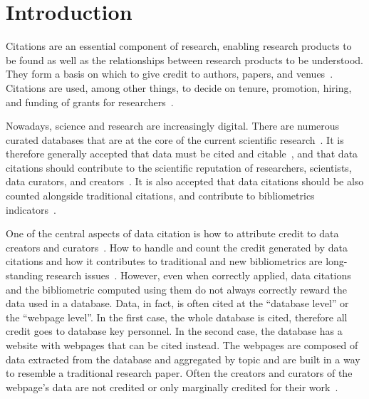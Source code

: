 \section{Introduction}

Citations are an essential component of research, enabling research products to be found as well as the relationships between research products to be understood. 
They form a basis on which to give credit to authors, papers, and venues~\citep{ZouP16, cousijn2019bringing, cronin1984}.
Citations are used, among other things, to decide on tenure, promotion, hiring, and funding of grants for researchers~\citep{meho2007impact, Cronin01, Hartley17, Kosten16}.

Nowadays, science and research are increasingly digital. There are numerous curated databases that are at the core of the current scientific research~\citep{bunemann2016citation}.
It is therefore generally accepted that data must be cited and citable~\citep{LawrenceEtAl2011,CallaghanDPTCKABBLLMHSWW12}, and that data citations should contribute to the scientific reputation of researchers, scientists, data curators, and creators~\citep{AltmanEtAl2015,Spengler2012}.
It is also accepted that data citations should be also counted alongside traditional citations, and contribute to bibliometrics indicators~\citep{Belter2014,Peters2016}.

One of the central aspects of data citation is how to attribute credit to data creators and curators~\citep{buneman2019summ}. 
How to handle and count the credit generated by data citations and how it contributes to traditional and new bibliometrics are long-standing research issues~\citep{garfield1999journal,Borgman2016}.
However, even when correctly applied, data citations and the bibliometric computed using them do not always correctly reward the data used in a database.
Data, in fact, is often cited at the ``database level'' or the ``webpage level''. 
In the first case, the whole database is cited, therefore all credit goes to database key personnel.
In the second case, the database has a website with webpages that can be cited instead. 
The webpages are composed of data extracted from the database and aggregated by topic and are built in a way to resemble a traditional research paper.
Often the creators and curators of the webpage's data are not credited or only marginally credited for their work~\citep{AlawiniDSTW17}.

